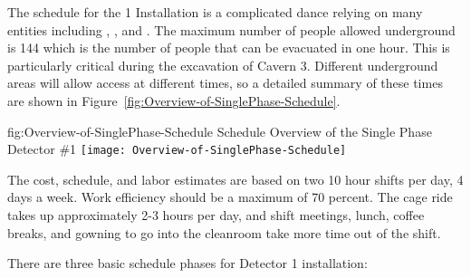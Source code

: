 The schedule for the  1 Installation is a complicated dance relying on many entities including , , and .  The maximum number of people allowed underground is 144 which is the number of people that can be evacuated in one hour.  This is particularly critical during the excavation of Cavern 3. Different underground areas will allow access at different times, so a detailed summary of these times are shown in Figure~\ref{fig:Overview-of-SinglePhase-Schedule}. 



\begin{dunefigure}
{fig:Overview-of-SinglePhase-Schedule}
{Schedule Overview of the Single Phase Detector \#1}                
\texttt{[image: Overview-of-SinglePhase-Schedule]}
\end{dunefigure}

The cost, schedule, and labor estimates are based on two 10 hour shifts per day, 4 days a week. Work efficiency should be a maximum of 70 percent.  The cage ride takes up approximately 2-3 hours per day, and shift meetings, lunch, coffee breaks, and gowning to go into the cleanroom take more time out of the shift. 

There are three basic schedule phases for Detector 1 installation:

